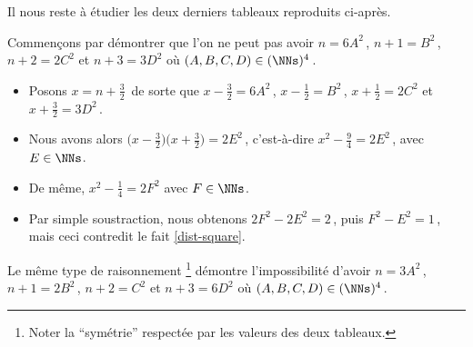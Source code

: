 \vspace{-1.5ex}
Il nous reste à étudier les deux derniers tableaux reproduits ci-après.

\begin{center}
\end{center}


Commençons par démontrer que l'on ne peut pas avoir
$n = 6 A^2$\,, $n + 1 = B^2$\,, $n + 2 = 2 C^2$ et $n + 3 = 3 D^2$
où $(A, B, C, D) \in ( \NNs )^4$\,.

\begin{itemize}
	\item Posons $x = n + \frac32$\, de sorte que
	$x - \frac32 = 6 A^2$\,, $x - \frac12 = B^2$\,, $x + \frac12 = 2 C^2$ et $x + \frac32 = 3 D^2$\,.

	\item Nous avons alors
	$\big( x - \frac32 \big) \big( x + \frac32 \big) = 2 E^2$\,, c'est-à-dire $x^2 - \frac94 = 2 E^2$\,, avec $E \in \NNs$.

	\item De même,
	$x^2 - \frac14 = 2 F^2$ avec $F \in \NNs$.

	\item Par simple soustraction, nous obtenons $2 F^2 - 2 E^2 = 2$\,, puis $F^2 - E^2 = 1$\,, mais ceci contredit le fait \ref{dist-square}.
\end{itemize}


Le même type de raisonnement
\footnote{
	Noter la \enquote{symétrie} respectée par les valeurs des deux tableaux.
}
démontre l'impossibilité d'avoir
$n = 3 A^2$\,, $n + 1 = 2 B^2$\,, $n + 2 = C^2$ et $n + 3 = 6 D^2$
où $(A, B, C, D) \in ( \NNs )^4$\,.
